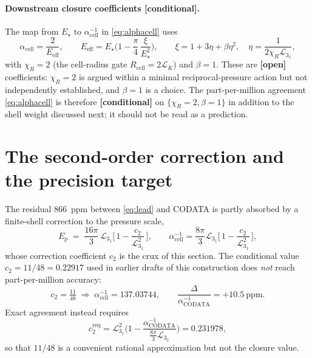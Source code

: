 \documentclass[11pt,a4paper]{article}
\theoremstyle{definition}
\newcommand{\conditional}{\textbf{[conditional]}}
\newcommand{\open}{\textbf{[open]}}
\begin{document}
\paragraph{Downstream closure coefficients \conditional{}.}
The map from $E_\star$ to $\alpha^{-1}_{\mathrm{cell}}$ in \eqref{eq:alphacell}
uses
\begin{equation}
  \alpha_{\mathrm{cell}} = \frac{2}{E_{\mathrm{eff}}},\qquad
  E_{\mathrm{eff}} = E_\star\Big(1-\frac{\pi}{4}\,\frac{\xi}{E_\star^2}\Big),\qquad
  \xi = 1+3\eta+\beta\eta^2,\quad
  \eta=\frac{1}{2\chi_R\mathcal{L}_{3_1}},
\end{equation}
with $\chi_R=2$ (the cell-radius gate $R_{\mathrm{cell}}=2\mathcal{L}_K$) and
$\beta=1$. These are \open{} coefficients: $\chi_R=2$ is argued within a minimal
reciprocal-pressure action but not independently established, and $\beta=1$ is a
choice. The part-per-million agreement \eqref{eq:alphacell} is therefore
\conditional{} on $\{\chi_R=2,\beta=1\}$ in addition to the shell weight discussed
next; it should not be read as a prediction.

\section{The second-order correction and the precision target}
\label{sec:obstruction}

The residual $866$~ppm between \eqref{eq:lead} and CODATA is partly absorbed by a
finite-shell correction to the pressure scale,
\begin{equation}
  E_p \;=\; \frac{16\pi}{3}\,\mathcal{L}_{3_1}
  \Big[\,1-\frac{c_2}{\mathcal{L}_{3_1}^2}\,\Big],
  \qquad
  \alpha^{-1}_{\mathrm{cell}} = \frac{8\pi}{3}\mathcal{L}_{3_1}
  \Big[\,1-\frac{c_2}{\mathcal{L}_{3_1}^2}\,\Big],
  \label{eq:shell}
\end{equation}
whose correction coefficient $c_2$ is the crux of this section. The conditional
value $c_2=11/48=0.22917$ used in earlier drafts of this construction does
\emph{not} reach part-per-million accuracy:
\begin{equation}
  c_2=\tfrac{11}{48}\;\Longrightarrow\;
  \alpha^{-1}_{\mathrm{cell}}=137.03744,\qquad
  \frac{\Delta}{\alpha^{-1}_{\mathrm{CODATA}}}=+10.5~\text{ppm}.
  \label{eq:1148}
\end{equation}
Exact agreement instead requires
\begin{equation}
  c_2^{\mathrm{req}}
  =\mathcal{L}_{3_1}^2\Big(1-\frac{\alpha^{-1}_{\mathrm{CODATA}}}{\tfrac{8\pi}{3}\mathcal{L}_{3_1}}\Big)
  =0.231978,
  \label{eq:c2req}
\end{equation}
so that $11/48$ is a convenient rational approximation but not the closure value.
\end{document}
